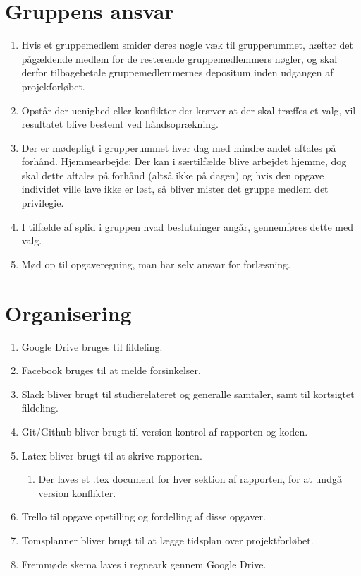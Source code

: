 \section{Gruppens ansvar}
\begin{enumerate}
\item Hvis et gruppemedlem smider deres nøgle væk til grupperummet, hæfter det pågældende medlem for de resterende gruppemedlemmers nøgler, og skal derfor tilbagebetale gruppemedlemmernes depositum inden udgangen af projekforløbet.
\item Opstår der uenighed eller konflikter der kræver at der skal træffes et valg, vil resultatet blive bestemt ved håndsoprækning.
\item Der er mødepligt i grupperummet hver dag med mindre andet aftales på forhånd.
Hjemmearbejde: Der kan i særtilfælde blive arbejdet hjemme, dog skal dette aftales på forhånd (altså ikke på dagen) og hvis den opgave individet ville lave ikke er løst, så bliver mister det gruppe medlem det privilegie.
\item I tilfælde af splid i gruppen hvad beslutninger angår, gennemføres dette med valg.
\item Mød op til opgaveregning, man har selv ansvar for forlæsning.
\end{enumerate}

\section{Organisering}
\begin{enumerate}
\item Google Drive bruges til fildeling.
\item Facebook bruges til at melde forsinkelser.
\item Slack bliver brugt til studierelateret og generalle samtaler, samt til kortsigtet fildeling.
\item Git/Github bliver brugt til version kontrol af rapporten og koden.
\item Latex bliver brugt til at skrive rapporten.
\begin{enumerate}
\item Der laves et .tex document for hver sektion af rapporten, for at undgå version konflikter.
\end{enumerate}
\item Trello til opgave opstilling og fordelling af disse opgaver.
\item Tomsplanner bliver brugt til at lægge tidsplan over projektforløbet.
\item Fremmøde skema laves i regneark gennem Google Drive.
\end{enumerate}

